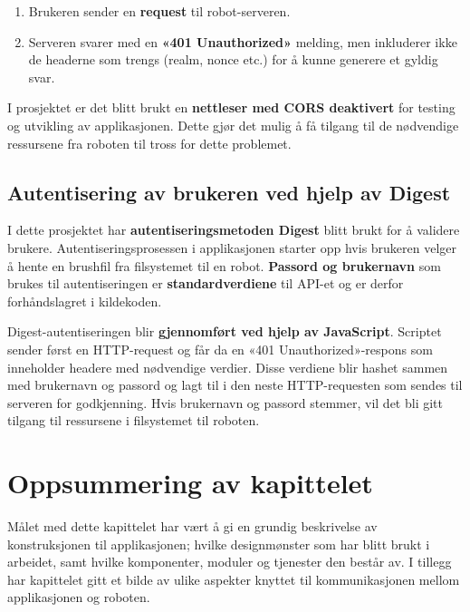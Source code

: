 \begin{enumerate}
    \item Brukeren sender en \textbf{request} til robot-serveren.
    \item Serveren svarer med en \textbf{«401 Unauthorized»} melding, men inkluderer ikke de headerne som trengs (realm, nonce etc.) for å kunne generere et gyldig svar.
\end{enumerate}

\noindent I prosjektet er det blitt brukt en \textbf{nettleser med CORS deaktivert} for testing og utvikling av applikasjonen. Dette gjør det mulig å få tilgang til de nødvendige ressursene fra roboten til tross for dette problemet.

\subsection{Autentisering av brukeren ved hjelp av Digest}
I dette prosjektet har \textbf{autentiseringsmetoden Digest} blitt brukt for å validere brukere. Autentiseringsprosessen i applikasjonen starter opp hvis brukeren velger å hente en brushfil fra filsystemet til en robot. \textbf{Passord og brukernavn} som brukes til autentiseringen er \textbf{standardverdiene} til API-et og er derfor forhåndslagret i kildekoden.

Digest-autentiseringen blir \textbf{gjennomført ved hjelp av JavaScript}. Scriptet sender først en HTTP-request og får da en «401 Unauthorized»-respons som inneholder headere med nødvendige verdier. Disse verdiene blir hashet sammen med brukernavn og passord og lagt til i den neste HTTP-requesten som sendes til serveren for godkjenning. Hvis brukernavn og passord stemmer, vil det bli gitt tilgang til ressursene i filsystemet til roboten. 

\section{Oppsummering av kapittelet}
Målet med dette kapittelet har vært å gi en grundig beskrivelse av konstruksjonen til applikasjonen; hvilke designmønster som har blitt brukt i arbeidet, samt hvilke komponenter, moduler og tjenester den består av. I tillegg har kapittelet gitt et bilde av ulike aspekter knyttet til kommunikasjonen mellom applikasjonen og roboten.